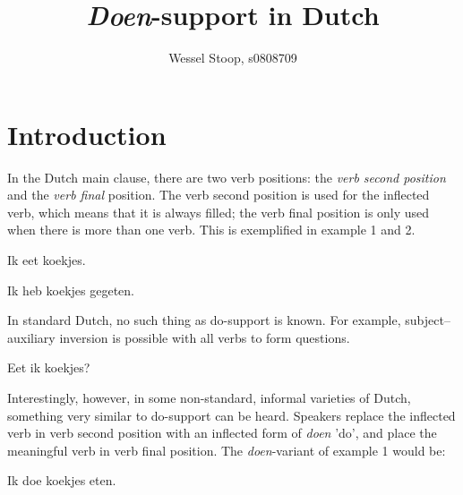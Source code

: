 \documentclass[12pt]{article}
\title{\emph{Doen}-support in Dutch}
\author{Wessel Stoop, s0808709}
\begin{document}
\maketitle

\section{Introduction}
In the Dutch main clause, there are two verb positions: the \emph{verb second position} and the \emph{verb final} position. The verb second position is used for the inflected verb, which means that it is always filled; the verb final position is only used when there is more than one verb. This is exemplified in example 1 and 2.

\begin{examples}
\item Ik eet koekjes.
\item Ik heb koekjes gegeten.
\end{examples}

In standard Dutch, no such thing as do-support is known. For example, subject–auxiliary inversion is possible with all verbs to form questions.

\begin{examples}
\item Eet ik koekjes?
\end{examples}

Interestingly, however, in some non-standard, informal varieties of Dutch, something very similar to do-support can be heard. Speakers replace the inflected verb in verb second position with an inflected form of \emph{doen} 'do', and place the meaningful verb in verb final position. The \emph{doen}-variant of example 1 would be:

\begin{examples}
\item Ik doe koekjes eten.
\end{examples}
\end{document}
